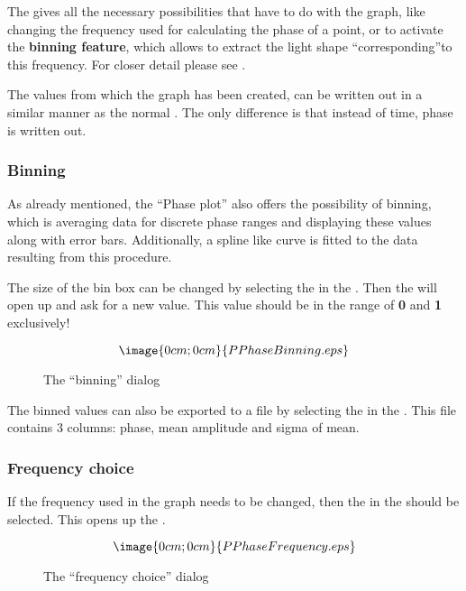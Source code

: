 The  gives all the necessary possibilities that have to do
with the graph, like changing the frequency used for calculating
the phase of a point,
or to activate the {\bf binning feature}, which allows to extract the 
light shape ``corresponding''to this frequency. 
For closer detail please see .

The values from which the graph has been created, can be written out in a 
similar manner as the normal 
%
. The only difference is that instead of time, phase is written out.

\subsubsection{Binning}%
\label{period.phase.binning}
As already mentioned, the ``Phase plot'' also offers the possibility of 
binning, which is averaging data for discrete phase ranges 
and displaying these values along with error bars.
Additionally, a spline like curve is fitted to the data resulting from this 
procedure.

The size of the bin box can be changed by selecting the
 in the .
Then the 
will open up and ask for a new value. This value should be in the 
range of {\bf 0} and {\bf 1} exclusively!
\begin{figure}[h]
$$\image{0cm;0cm}{PPhaseBinning.eps}$$%
\caption{The ``binning'' dialog}%
\label{period.phase.binning.dialog}%
\end{figure}

The binned values can also be exported to a file by selecting the
 in the . This file contains
3 columns: phase, mean amplitude and sigma of mean.

\subsubsection{Frequency choice}%
\label{period.phase.frequency}
If the frequency used in the graph needs to be changed, then the 
 in the  should be selected.
This opens up the 
.
\begin{figure}[h]
$$\image{0cm;0cm}{PPhaseFrequency.eps}$$%
\caption{The ``frequency choice'' dialog}%
\label{period.phase.frequency.dialog}
\end{figure}

